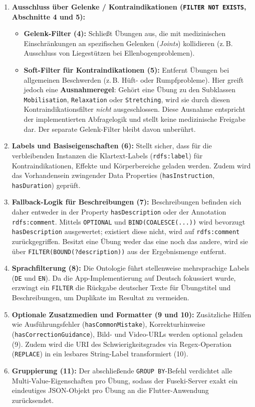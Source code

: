 \begin{enumerate}
    \item \textbf{Ausschluss über Gelenke / Kontraindikationen (\texttt{FILTER NOT EXISTS}, Abschnitte 4 und 5):}
    \begin{itemize}
        \item \textbf{Gelenk-Filter (4):} Schließt Übungen aus, die mit medizinischen Einschränkungen an spezifischen Gelenken (\textit{Joints}) kollidieren (z.\,B. Ausschluss von Liegestützen bei Ellenbogenproblemen).
        \item \textbf{Soft-Filter für Kontraindikationen (5):} Entfernt Übungen bei allgemeinen Beschwerden (z.\,B. Hüft- oder Rumpfprobleme). Hier greift jedoch eine \textbf{Ausnahmeregel}: Gehört eine Übung zu den Subklassen \texttt{Mobilisation}, \texttt{Relaxation} oder \texttt{Stretching}, wird sie durch diesen Kontraindikationsfilter \textit{nicht} ausgeschlossen. Diese Ausnahme entspricht der implementierten Abfragelogik und stellt keine medizinische Freigabe dar. Der separate Gelenk-Filter bleibt davon unberührt.
    \end{itemize}

    \item \textbf{Labels und Basiseigenschaften (6):}
    Stellt sicher, dass für die verbleibenden Instanzen die Klartext-Labels (\texttt{rdfs:label}) für Kontraindikationen, Effekte und Körperbereiche geladen werden. Zudem wird das Vorhandensein zwingender Data Properties (\texttt{hasInstruction}, \texttt{hasDuration}) geprüft.

    \item \textbf{Fallback-Logik für Beschreibungen (7):}
    Beschreibungen befinden sich daher entweder in der Property \texttt{hasDescription} oder der Annotation \texttt{rdfs:comment}. Mittels \texttt{OPTIONAL} und \texttt{BIND(COALESCE(...))} wird bevorzugt \texttt{hasDescription} ausgewertet; existiert diese nicht, wird auf \texttt{rdfs:comment} zurückgegriffen. Besitzt eine Übung weder das eine noch das andere, wird sie über \texttt{FILTER(BOUND(?description))} aus der Ergebnismenge entfernt.

    \item \textbf{Sprachfilterung (8):}
    Die Ontologie führt stellenweise mehrsprachige Labels (\texttt{DE} und \texttt{EN}). Da die App-Implementierung auf Deutsch fokussiert wurde, erzwingt ein \texttt{FILTER} die Rückgabe deutscher Texte für Übungstitel und Beschreibungen, um Duplikate im Resultat zu vermeiden.

    \item \textbf{Optionale Zusatzmedien und Formatter (9 und 10):}
    Zusätzliche Hilfen wie Ausführungsfehler (\texttt{hasCommonMistake}), Korrekturhinweise (\texttt{hasCorrectionGuidance}), Bild- und Video-URLs werden optional geladen (9). Zudem wird die URI des Schwierigkeitsgrades via Regex-Operation (\texttt{REPLACE}) in ein lesbares String-Label transformiert (10).

    \item \textbf{Gruppierung (11):}
    Der abschließende \texttt{GROUP BY}-Befehl verdichtet alle Multi-Value-Eigenschaften pro Übung, sodass der Fuseki-Server exakt ein eindeutiges JSON-Objekt pro Übung an die Flutter-Anwendung zurücksendet.
\end{enumerate}

